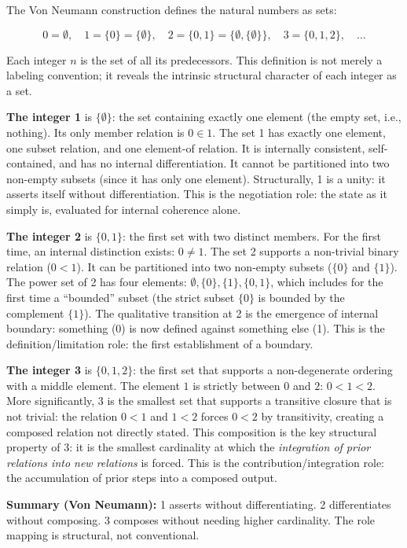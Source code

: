 \documentclass[
  11pt,
  letterpaper,
]{article}
\begin{document}
The Von Neumann construction defines the natural numbers as sets:

\[0 = \emptyset, \quad 1 = \{0\} = \{\emptyset\}, \quad 2 = \{0,1\} = \{\emptyset, \{\emptyset\}\}, \quad 3 = \{0,1,2\}, \quad \ldots\]

Each integer \(n\) is the set of all its predecessors. This definition
is not merely a labeling convention; it reveals the intrinsic structural
character of each integer as a set.

\textbf{The integer 1} is \(\{\emptyset\}\): the set containing exactly
one element (the empty set, i.e., nothing). Its only member relation is
\(0 \in 1\). The set 1 has exactly one element, one subset relation, and
one element-of relation. It is internally consistent, self-contained,
and has no internal differentiation. It cannot be partitioned into two
non-empty subsets (since it has only one element). Structurally, 1 is a
unity: it asserts itself without differentiation. This is the
negotiation role: the state as it simply is, evaluated for internal
coherence alone.

\textbf{The integer 2} is \(\{0, 1\}\): the first set with two distinct
members. For the first time, an internal distinction exists:
\(0 \neq 1\). The set 2 supports a non-trivial binary relation
(\(0 < 1\)). It can be partitioned into two non-empty subsets (\(\{0\}\)
and \(\{1\}\)). The power set of 2 has four elements:
\(\emptyset, \{0\}, \{1\}, \{0,1\}\), which includes for the first time
a ``bounded'' subset (the strict subset \(\{0\}\) is bounded by the
complement \(\{1\}\)). The qualitative transition at 2 is the emergence
of internal boundary: something (0) is now defined against something
else (1). This is the definition/limitation role: the first
establishment of a boundary.

\textbf{The integer 3} is \(\{0, 1, 2\}\): the first set that supports a
non-degenerate ordering with a middle element. The element \(1\) is
strictly between \(0\) and \(2\): \(0 < 1 < 2\). More significantly, 3
is the smallest set that supports a transitive closure that is not
trivial: the relation \(0 < 1\) and \(1 < 2\) forces \(0 < 2\) by
transitivity, creating a composed relation not directly stated. This
composition is the key structural property of 3: it is the smallest
cardinality at which the \emph{integration of prior relations into new
relations} is forced. This is the contribution/integration role: the
accumulation of prior steps into a composed output.

\textbf{Summary (Von Neumann):} 1 asserts without differentiating. 2
differentiates without composing. 3 composes without needing higher
cardinality. The role mapping is structural, not conventional.
\end{document}
